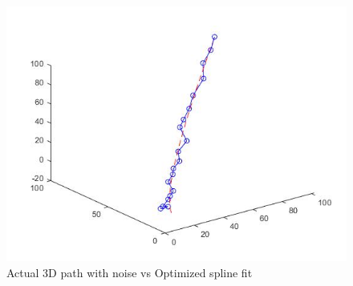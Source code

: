 \begin{figure}[!htb]
\includegraphics[width=\textwidth]{./figures/3DCurve.jpg}
\caption{Actual 3D path with noise vs Optimized spline fit}
\label{fig:errorc1}
\end{figure}